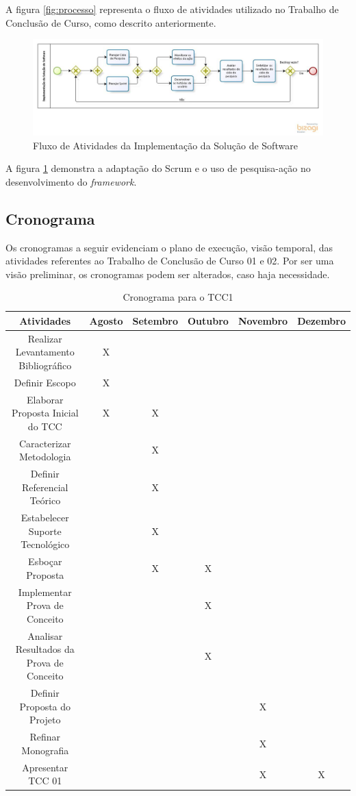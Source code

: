\par 
\indent A figura \ref{fig:processo} representa o fluxo de atividades utilizado no Trabalho de Conclusão de Curso, como descrito anteriormente.  
  
    \begin{figure}[h]
    \centering
    \includegraphics[width=\textwidth]{figuras/ProcessoInterno.jpg}
    \caption{Fluxo de Atividades da Implementação da Solução de Software}
    \label{fig:processointerno}
  \end{figure}

\par 
\indent A figura \ref{fig:processointerno} demonstra a adaptação do Scrum e o uso de pesquisa-ação no desenvolvimento do \textit{framework}. 
 
 \subsection{Cronograma}
 
	Os cronogramas a seguir evidenciam o plano de execução, visão temporal, das atividades referentes ao Trabalho de Conclusão de Curso 01 e 02. Por ser uma visão preliminar, os cronogramas podem ser alterados, caso haja necessidade. 
	  
\begin{table}[h]
  \tiny
  \centering
  \caption{Cronograma para o TCC1}
  \label{cronograma-tcc-1}
  \begin{tabular}{| c | c | c | c | c | c |}
    \hline
    Atividades & Agosto & Setembro & Outubro & Novembro & Dezembro \\ \hline
    Realizar Levantamento Bibliográfico & X &  &  &  &  \\
    Definir Escopo & X &  &  &  &  \\
    Elaborar Proposta Inicial do TCC & X & X &  &  &  \\
    Caracterizar Metodologia &  & X &  &  &  \\
    Definir Referencial Teórico &  & X &  &  &  \\
    Estabelecer Suporte Tecnológico &  & X &  &  &  \\
    Esboçar Proposta &  & X & X &  &  \\
    Implementar Prova de Conceito &  &  & X &  &  \\
    Analisar Resultados da Prova de Conceito &  &  & X &  &  \\
    Definir Proposta do Projeto &  &  &  & X &  \\
    Refinar Monografia &  &  &  & X &  \\
    Apresentar TCC 01 &  &  &  & X & X \\ \hline
  \end{tabular}
\end{table}
  

